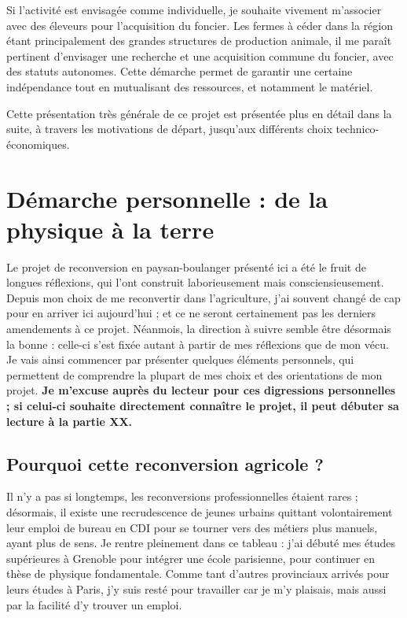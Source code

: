 \documentclass{book}
\begin{document}
Si l'activité est envisagée comme individuelle, je souhaite vivement m'associer avec des éleveurs pour l'acquisition du foncier. Les fermes à céder dans la région étant principalement des grandes structures de production animale, il me paraît pertinent d'envisager une recherche et une acquisition commune du foncier, avec des statuts autonomes. Cette démarche permet de garantir une certaine indépendance tout en mutualisant des ressources, et notamment le matériel.

Cette présentation très générale de ce projet est présentée plus en détail dans la suite, à travers les motivations de départ, jusqu'aux différents choix technico-économiques.

\section{Démarche personnelle : de la physique à la terre}

Le projet de reconversion en paysan-boulanger présenté ici a été le fruit de longues réflexions, qui l'ont construit laborieusement mais consciensieusement. Depuis mon choix de me reconvertir dans l'agriculture, j'ai souvent changé de cap pour en arriver ici aujourd'hui ; et ce ne seront certainement pas les derniers amendements à ce projet. Néanmois, la direction à suivre semble être désormais la bonne : celle-ci s'est fixée autant à partir de mes réflexions que de mon vécu. Je vais ainsi commencer par présenter quelques éléments personnels, qui permettent de comprendre la plupart de mes choix et des orientations de mon projet.\textbf{ Je m'excuse auprès du lecteur pour ces digressions personnelles ; si celui-ci souhaite directement connaître le projet, il peut débuter sa lecture à la partie XX.}

\subsection{Pourquoi cette reconversion agricole ?}

Il n'y a pas si longtemps, les reconversions professionnelles étaient rares ; désormais, il existe une recrudescence de jeunes urbains quittant volontairement leur emploi de bureau en CDI pour se tourner vers des métiers plus manuels, ayant plus de sens. Je rentre pleinement dans ce tableau : j'ai débuté mes études supérieures à Grenoble pour intégrer une école parisienne, pour continuer en thèse de physique fondamentale. Comme tant d'autres provinciaux arrivés pour leurs études à Paris, j'y suis resté pour travailler car je m'y plaisais, mais aussi par la facilité d'y trouver un emploi.
\end{document}
